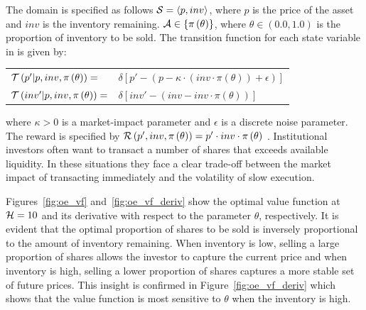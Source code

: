 The domain is specified as follows {\footnotesize $ \mathcal{S} = \left\langle p, inv \right\rangle$}, where $ p $ is the price of the asset and $ inv $ is the inventory remaining. {\footnotesize $ \mathcal{A} \in \left\lbrace \pi\left( \theta \right) \right\rbrace$}, where {\footnotesize $ \theta \in \left( 0.0, 1.0\right)$} is the proportion of inventory to be sold. The transition function {\footnotesize \Transition} for each state variable in {\footnotesize \State} is given by:
{\footnotesize 
    \abovedisplayskip=5pt
    \belowdisplayskip=0pt
    \renewcommand{\arraystretch}{1.5}
    \begin{tabular}{ll}
        $\mathcal{T}\left( p' | p, inv, \pi\left( \theta \right) \right) =$ & $ \delta \left[ p' - (p - \kappa \cdot (inv \cdot \pi\left( \theta \right)) + \epsilon) \right] $ \\
        $\mathcal{T}\left( inv' | p, inv, \pi\left( \theta \right) \right) =$ & $\delta \left[ inv' - (inv - inv \cdot \pi\left( \theta \right)) \right] $ \\
    \end{tabular}
}%
where {\footnotesize $ \kappa > 0$} is a market-impact parameter and {\footnotesize $ \epsilon $} is a discrete noise parameter. The reward is specified by {\footnotesize $ \mathcal{R}\left(p', inv, \pi\left( \theta \right) \right) = p' \cdot inv \cdot \pi\left( \theta \right)$ }. Institutional investors often want to transact a number of shares that exceeds available liquidity. In these situations they face a clear trade-off between the market impact of transacting immediately and the volatility of slow execution. 

Figures~\ref{fig:oe_vf} and~\ref{fig:oe_vf_deriv} show the optimal value function at {\footnotesize $ \mathcal{H} = 10 $} and its derivative with respect to the parameter {\footnotesize $ \theta$}, respectively. It is evident that the optimal proportion of shares to be sold is inversely proportional to the amount of inventory remaining. When inventory is low, selling a large proportion of shares allows the investor to capture the current price and when inventory is high, selling a lower proportion of shares captures a more stable set of future prices.
This insight is confirmed in Figure~\ref{fig:oe_vf_deriv} which shows that the value function is most sensitive to {\footnotesize $\theta$} when the inventory is high.

